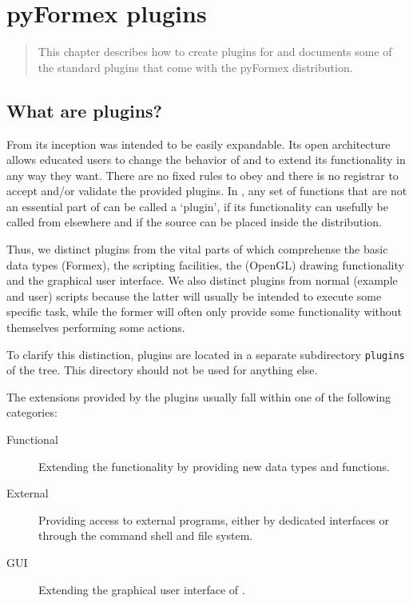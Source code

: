 
\chapter{pyFormex plugins}
\label{cha:plugins}

\begin{abstract}
This chapter describes how to create plugins for \pyformex and documents some of the
standard plugins that come with the pyFormex distribution.
\end{abstract}


\section{What are \pyformex plugins?}
\label{sec:plugins-def}

From its inception \pyformex was intended to be easily expandable. Its open 
architecture allows educated users to change the behavior of \pyformex and to extend its functionality in any way they want. There are no fixed rules to obey and there is no registrar to accept and/or validate the provided plugins. In \pyformex, any  set of functions that are not an essential part of \pyformex can be called a `plugin', if its functionality can usefully be called from elsewhere and if the source can be placed inside the \pyformex distribution.

Thus, we distinct plugins from the vital parts of \pyformex which comprehense the basic data types (Formex), the scripting facilities, the (OpenGL) drawing functionality and the graphical user interface.
We also distinct plugins from normal (example and user) \pyformex scripts because the latter will usually be intended to execute some specific task, while the former will often only provide some functionality without themselves performing some actions.

To clarify this distinction, plugins are located in a separate subdirectory \texttt{plugins} of the \pyformex tree. This directory should not be used for anything else. 

The extensions provided by the plugins usually fall within one of the following categories:
\begin{description}
\item[Functional] Extending the \pyformex functionality by providing new data types and functions.
\item[External] Providing access to external programs, either by dedicated interfaces or through the command shell and file system.
\item[GUI] Extending the graphical user interface of \pyformex. 
\end{description}
   
